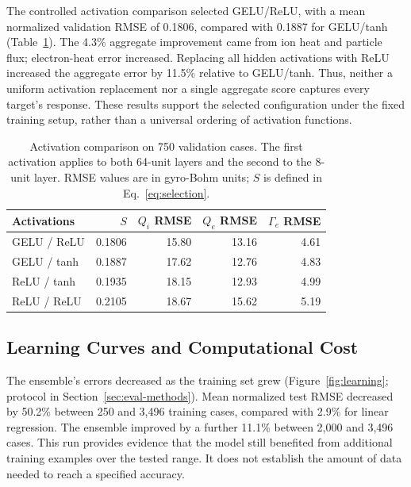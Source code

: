 \documentclass[12pt,letterpaper]{article}
\begin{document}
The controlled activation comparison selected GELU/ReLU, with a mean
normalized validation RMSE of 0.1806, compared with 0.1887 for GELU/tanh
(Table~\ref{tab:activations}). The 4.3\% aggregate improvement came from
ion heat and particle flux; electron-heat error increased. Replacing all
hidden activations with ReLU increased the aggregate error by 11.5\%
relative to GELU/tanh. Thus, neither a uniform activation replacement nor a
single aggregate score captures every target's response. These results
support the selected configuration under the fixed training setup, rather
than a universal ordering of activation functions.

\begin{table}[H]
  \centering
  \caption{Activation comparison on 750 validation cases. The first activation
    applies to both 64-unit layers and the second to the 8-unit layer.
    RMSE values are in gyro-Bohm units; $S$ is defined in Eq.~\ref{eq:selection}.}
  \label{tab:activations}
  \small
  \begin{tabular}{lrrrr}
    \toprule
    Activations & $S$    & $Q_i$ RMSE & $Q_e$ RMSE & $\Gamma_e$ RMSE \\
    \midrule
    GELU / ReLU & 0.1806 & 15.80      & 13.16      & 4.61            \\
    GELU / tanh & 0.1887 & 17.62      & 12.76      & 4.83            \\
    ReLU / tanh & 0.1935 & 18.15      & 12.93      & 4.99            \\
    ReLU / ReLU & 0.2105 & 18.67      & 15.62      & 5.19            \\
    \bottomrule
  \end{tabular}
\end{table}

\subsection{Learning Curves and Computational Cost}
\label{sec:learning-results}

The ensemble's errors decreased as the training set grew
(Figure~\ref{fig:learning}; protocol in Section~\ref{sec:eval-methods}). Mean normalized test RMSE decreased by 50.2\%
between 250 and 3,496 training cases, compared with 2.9\% for linear regression.
The ensemble improved by a further 11.1\% between 2,000 and 3,496 cases.
This run provides evidence that the model still benefited from additional
training examples over the tested range. It does not establish the amount
of data needed to reach a specified accuracy.
\end{document}
